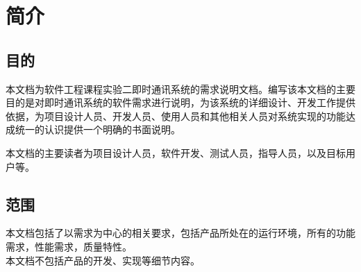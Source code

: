 \chapter{简介}
\section{目的}


本文档为软件工程课程实验二即时通讯系统的需求说明文档。编写该本文档的主要目的是对即时通讯系统的软件需求进行说明，为该系统的详细设计、开发工作提供依据，为项目设计人员、开发人员、使用人员和其他相关人员对系统实现的功能达成统一的认识提供一个明确的书面说明。

本文档的主要读者为项目设计人员，软件开发、测试人员，指导人员，以及目标用户等。

\section{范围}

本文档包括了以需求为中心的相关要求，包括产品所处在的运行环境，所有的功能需求，性能需求，质量特性。\\
本文档不包括产品的开发、实现等细节内容。
